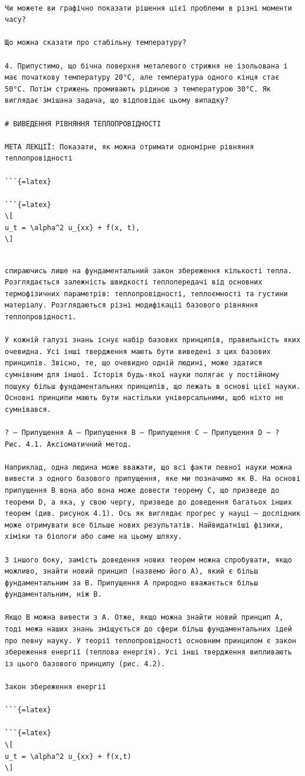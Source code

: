 \documentclass[
]{article}
\begin{document}
\begin{verbatim}

Чи можете ви графічно показати рішення цієї проблеми в різні моменти часу?

Що можна сказати про стабільну температуру?

4. Припустимо, що бічна поверхня металевого стрижня не ізольована і має початкову температуру 20°C, але температура одного кінця стає 50°C. Потім стрижень промивають рідиною з температурою 30°C. Як виглядає змішана задача, що відповідає цьому випадку?

# ВИВЕДЕННЯ РІВНЯННЯ ТЕПЛОПРОВІДНОСТІ

МЕТА ЛЕКЦІЇ: Показати, як можна отримати одномірне рівняння теплопровідності

```{=latex}

```{=latex}
\[
u_t = \alpha^2 u_{xx} + f(x, t),
\]
\end{verbatim}

\begin{verbatim}

спираючись лише на фундаментальний закон збереження кількості тепла. Розглядається залежність швидкості теплопередачі від основних термофізичних параметрів: теплопровідності, теплоємності та густини матеріалу. Розглядаються різні модифікації базового рівняння теплопровідності.

У кожній галузі знань існує набір базових принципів, правильність яких очевидна. Усі інші твердження мають бути виведені з цих базових принципів. Звісно, те, що очевидно одній людині, може здатися сумнівним для іншої. Історія будь-якої науки полягає у постійному пошуку більш фундаментальних принципів, що лежать в основі цієї науки. Основні принципи мають бути настільки універсальними, щоб ніхто не сумнівався.

? — Припущення A — Припущення B — Припущення C — Припущення D — ?
Рис. 4.1. Аксіоматичний метод.

Наприклад, одна людина може вважати, що всі факти певної науки можна вивести з одного базового припущення, яке ми позначимо як B. На основі припущення B вона або вона може довести теорему C, що призведе до теореми D, а яка, у свою чергу, призведе до доведення багатьох інших теорем (див. рисунок 4.1). Ось як виглядає прогрес у науці — дослідник може отримувати все більше нових результатів. Найвидатніші фізики, хіміки та біологи або саме на цьому шляху.

З іншого боку, замість доведення нових теорем можна спробувати, якщо можливо, знайти новий принцип (назвемо його A), який є більш фундаментальним за B. Припущення A природно вважається більш фундаментальним, ніж B.

Якщо B можна вивести з A. Отже, якщо можна знайти новий принцип A, тоді межа наших знань зміщується до сфери більш фундаментальних ідей про певну науку. У теорії теплопровідності основним принципом є закон збереження енергії (теплова енергія). Усі інші твердження випливають із цього базового принципу (рис. 4.2).

Закон збереження енергії

```{=latex}

```{=latex}
\[
u_t = \alpha^2 u_{xx} + f(x,t)
\]
\end{verbatim}
\end{document}
